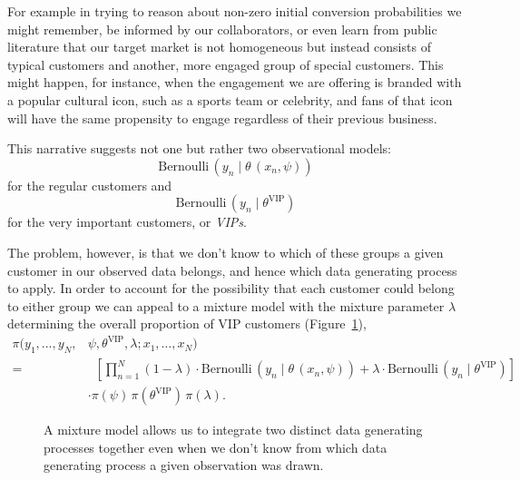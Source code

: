 \documentclass[
  letterpaper,
  DIV=11,
  numbers=noendperiod]{scrartcl}
\begin{document}
For example in trying to reason about non-zero initial conversion
probabilities we might remember, be informed by our collaborators, or
even learn from public literature that our target market is not
homogeneous but instead consists of typical customers and another, more
engaged group of special customers. This might happen, for instance,
when the engagement we are offering is branded with a popular cultural
icon, such as a sports team or celebrity, and fans of that icon will
have the same propensity to engage regardless of their previous
business.

This narrative suggests not one but rather two observational models: \[
\text{Bernoulli} \,(y_{n} \mid \theta \, (x_{n}, \psi))
\] for the regular customers and \[
\text{Bernoulli} \,(y_{n} \mid \theta^{\text{VIP}})
\] for the very important customers, or \emph{VIPs}.

The problem, however, is that we don't know to which of these groups a
given customer in our observed data belongs, and hence which data
generating process to apply. In order to account for the possibility
that each customer could belong to either group we can appeal to a
mixture model with the mixture parameter \(\lambda\) determining the
overall proportion of VIP customers (Figure~\ref{fig-model3}),
\begin{align*}
\pi(y_{1}, \ldots, y_{N}, &\psi, \theta^{\text{VIP}}, \lambda;
    x_{1}, \ldots, x_{N})
\\
=& \;\;
\left[
\prod_{n = 1}^{N}
  (1 - \lambda) \cdot \text{Bernoulli} \,(y_{n} \mid \theta \, (x_{n}, \psi))
+ \lambda \cdot \text{Bernoulli} \,(y_{n} \mid \theta^{\text{VIP}})
\right]
\\
& \cdot
\pi(\psi) \, \pi(\theta^{\text{VIP}}) \, \pi(\lambda).
\end{align*}

\begin{figure}


\caption{\label{fig-model3}A mixture model allows us to integrate two
distinct data generating processes together even when we don't know from
which data generating process a given observation was drawn.}

\end{figure}%
\end{document}
